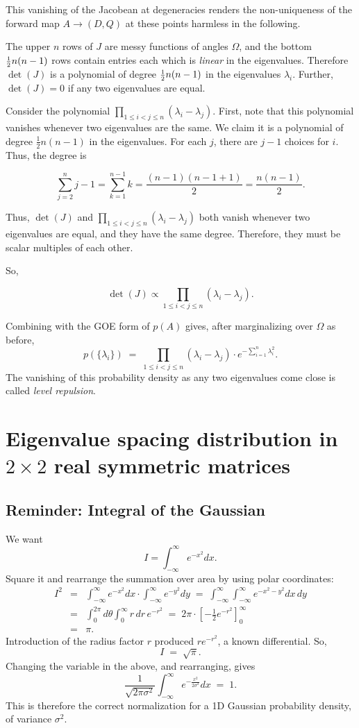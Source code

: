 \documentclass[12pt,letterpaper]{report}
\newcommand\be{\begin{equation}}
\newcommand\ee{\end{equation}}
\newcommand\bea{\begin{eqnarray}}
\newcommand\eea{\end{eqnarray}}
\newcommand{\foh}{\frac{1}{2}}  %
\newcommand{\half}{\mbox{\small $\frac{1}{2}$}}
\newcommand{\infint}{\int_{-\infty}^{\infty} \!\!}  %
\begin{document}
This vanishing of the Jacobean at degeneracies renders the
non-uniqueness of the forward map $A \rightarrow (D,Q)$ at these
points harmless in the following.

The upper $n$ rows of $J$ are messy functions of angles $\Omega$,
and the bottom $\half n(n-1)$ rows contain entries each which is
{\em linear} in the eigenvalues. Therefore $\det(J)$ is a
polynomial of degree $\half n(n-1)$ in the eigenvalues
$\lambda_i$. Further, $\det(J) = 0$ if any two eigenvalues are
equal.

Consider the polynomial $\prod_{1\le i<j\le n}
(\lambda_i-\lambda_j)$. First, note that this polynomial vanishes
whenever two eigenvalues are the same. We claim it is a polynomial
of degree $\foh n(n-1)$ in the eigenvalues. For each $j$, there
are $j-1$ choices for $i$. Thus, the degree is

\be \sum_{j=2}^n j-1 = \sum_{k=1}^{n-1} k = \frac{(n-1)(n-1+1)}{2}
= \frac{n(n-1)}{2}. \ee

Thus, $\det(J)$ and $\prod_{1\le i<j\le n} (\lambda_i-\lambda_j)$
both vanish whenever two eigenvalues are equal, and they have the
same degree. Therefore, they must be scalar multiples of each
other.

So,

\be \det(J) \propto \prod_{1\le i<j\le n} (\lambda_i-\lambda_j).
\ee

Combining with the GOE form of $p(A)$ gives, after marginalizing
over $\Omega$ as before, \be p(\{\lambda_i\}) \; = \; \prod_{1\le
i<j\le n} (\lambda_i-\lambda_j) \cdot e^{-\sum_{i=1}^n
\lambda_i^2}. \ee The vanishing of this probability density as any
two eigenvalues come close is called {\em level repulsion}.


\section{Eigenvalue spacing distribution in $2\times 2$ real symmetric matrices}

\subsection{Reminder: Integral of the Gaussian}

We want \be I = \infint e^{-x^2} dx. \ee Square it and rearrange
the summation over area by using polar coordinates: \bea I^2 & = &
\infint e^{-x^2} dx \cdot \infint e^{-y^2} dy \; = \;
\infint \infint e^{-x^2 - y^2} dx\,dy \nonumber \\
& = & \int_0^{2\pi} d\theta \int_0^{\infty} r\, dr \,e^{-r^2} \; =
\;
2\pi \cdot \left[ -\frac{1}{2} e^{-r^2}\right]_0^{\infty} \nonumber \\
& = & \pi. \eea Introduction of the radius factor $r$ produced
$re^{-r^2}$, a known differential. So, \be I \; = \; \sqrt{\pi}.
\ee Changing the variable in the above, and rearranging, gives \be
\frac{1}{\sqrt{2\pi\sigma^2}} \infint e^{-\frac{x^2}{2\sigma^2}}
dx \; = \; 1. \ee This is therefore the correct normalization for
a 1D Gaussian probability density, of variance $\sigma^2$.
\end{document}
